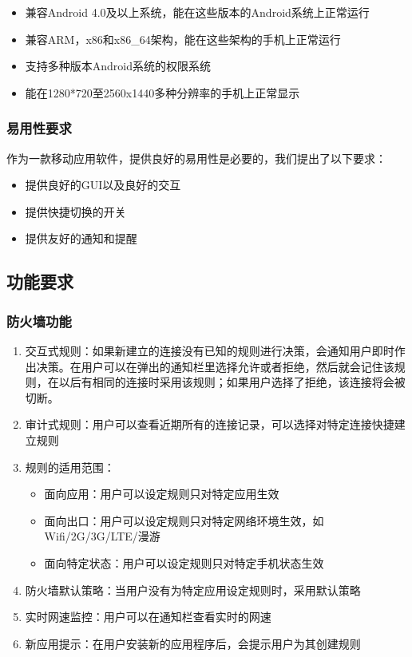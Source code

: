 \documentclass[format=final, language=chinese, degree=fyp]{hustthesis}
\begin{document}
\begin{itemize}
	\item 兼容Android 4.0及以上系统，能在这些版本的Android系统上正常运行
	\item 兼容ARM，x86和x86\_64架构，能在这些架构的手机上正常运行
	\item 支持多种版本Android系统的权限系统
	\item 能在1280*720至2560x1440多种分辨率的手机上正常显示
\end{itemize}

\subsubsection{易用性要求}
	作为一款移动应用软件，提供良好的易用性是必要的，我们提出了以下要求：
	\begin{itemize}
		\item 提供良好的GUI以及良好的交互
		\item 提供快捷切换的开关
		\item 提供友好的通知和提醒
	\end{itemize}

\subsection{功能要求}

\subsubsection{防火墙功能}
\begin{enumerate}
	\item 交互式规则：如果新建立的连接没有已知的规则进行决策，会通知用户即时作出决策。在用户可以在弹出的通知栏里选择允许或者拒绝，然后就会记住该规则，在以后有相同的连接时采用该规则；如果用户选择了拒绝，该连接将会被切断。
	\item 审计式规则：用户可以查看近期所有的连接记录，可以选择对特定连接快捷建立规则
	\item 规则的适用范围：
		\begin{itemize}
			\item 面向应用：用户可以设定规则只对特定应用生效
			\item 面向出口：用户可以设定规则只对特定网络环境生效，如Wifi/2G/3G/LTE/漫游
			\item 面向特定状态：用户可以设定规则只对特定手机状态生效
		\end{itemize}
	\item 防火墙默认策略：当用户没有为特定应用设定规则时，采用默认策略
	\item 实时网速监控：用户可以在通知栏查看实时的网速
	\item 新应用提示：在用户安装新的应用程序后，会提示用户为其创建规则
\end{enumerate}
\end{document}

